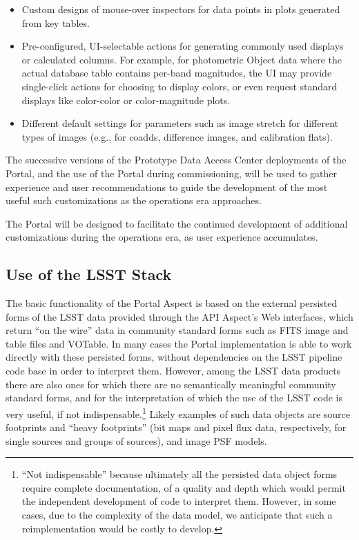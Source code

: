 \begin{itemize}
\item Custom designs of mouse-over inspectors for data points in plots generated from key tables.
\item Pre-configured, UI-selectable actions for generating commonly used displays or calculated columns.
For example, for photometric Object data where the actual database table contains per-band magnitudes, the UI may provide single-click actions for choosing to display colors, or even request standard displays like color-color or color-magnitude plots.
\item Different default settings for parameters such as image stretch for different types of images (e.g., for coadds, difference images, and calibration flats).
\end{itemize}

The successive versions of the Prototype Data Access Center deployments of the Portal, and the use of the Portal during commissioning, will be used to gather experience and user recommendations to guide the development of the most useful such customizations as the operations era approaches.

The Portal will be designed to facilitate the continued development of additional customizations during the operations era, as user experience accumulates.

\subsection{Use of the LSST Stack}\label{use-of-the-lsst-stack}

The basic functionality of the Portal Aspect is based on the external persisted forms of the LSST data provided through the API Aspect's Web interfaces, which return ``on the wire'' data in community standard forms such as FITS image and table files and VOTable.
In many cases the Portal implementation is able to work directly with these persisted forms, without dependencies on the LSST pipeline code base in order to interpret them.
However, among the LSST data products there are also ones for which there are no semantically meaningful community standard forms, and for the interpretation of which the use of the LSST code is very useful, if not indispensable.\footnote{``Not indispensable'' because ultimately all the persisted data object forms require complete documentation, of a quality and depth which would permit the independent development of code to interpret them.  However, in some cases, due to the complexity of the data model, we anticipate that such a reimplementation would be costly to develop.}
Likely examples of such data objects are source footprints and ``heavy footprints'' (bit maps and pixel flux data, respectively, for single sources and groups of sources), and image PSF models.

